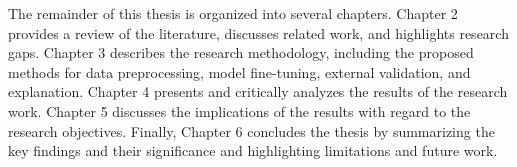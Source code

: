The remainder of this thesis is organized into several chapters. Chapter 2 provides a review of the literature, discusses related work, and highlights research gaps. Chapter 3 describes the research methodology, including the proposed methods for data preprocessing, model fine-tuning, external validation, and explanation. Chapter 4 presents and critically analyzes the results of the research work. Chapter 5 discusses the implications of the results with regard to the research objectives. Finally, Chapter 6 concludes the thesis by summarizing the key findings and their significance and highlighting limitations and future work.